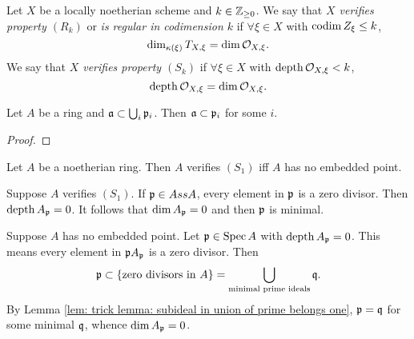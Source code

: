
    \begin{definition}\label{def: regular and Serre's conditions}
        Let $X$ be a locally noetherian scheme and $k \in {\mathbb{Z}}_{\geq 0}$.
        We say that \textit{$X$ verifies property $(R_k)$} or \textit{is regular in codimension $k$} if $\forall \xi \in X$ with $\operatorname{codim} Z_\xi \leq k$, 
        \[ \dim_{{\kappa}(\xi)} T_{X,\xi} = \dim {\mathcal{O}}_{X,\xi}. \]
        We say that \textit{$X$ verifies property $(S_k)$} if $\forall \xi \in X$ with $\operatorname{depth} {\mathcal{O}}_{X,\xi} < k$,
        \[ \operatorname{depth} {\mathcal{O}}_{X,\xi} = \dim {\mathcal{O}}_{X,\xi}. \]        
    \end{definition}

    \begin{lemma}\label{lem: trick lemma: subideal in union of prime belongs one}
        Let $A$ be a ring and ${\mathfrak{a}} \subset \bigcup_i {\mathfrak{p}}_i$.
        Then ${\mathfrak{a}} \subset {\mathfrak{p}}_i$ for some $i$.
    \end{lemma}
    \begin{proof}
    \end{proof}

    \begin{example}\label{eg: S_1 is equivalent to A has no embedded point}
        Let $A$ be a noetherian ring.
        Then $A$ verifies $(S_1)$ iff $A$ has no embedded point.
        
        Suppose $A$ verifies $(S_1)$.
        If ${\mathfrak{p}} \in Ass A$, every element in ${\mathfrak{p}}$ is a zero divisor.
        Then $\operatorname{depth} A_{{\mathfrak{p}}} = 0$.
        It follows that $\dim A_{\mathfrak{p}} = 0$ and then ${\mathfrak{p}}$ is minimal. 

        Suppose $A$ has no embedded point.
        Let ${\mathfrak{p}} \in \operatorname{Spec} A$ with $\operatorname{depth} A_{\mathfrak{p}} = 0$.
        This means every element in ${\mathfrak{p}} A_{\mathfrak{p}}$ is a zero divisor.
        Then 
        \[ {\mathfrak{p}} \subset \{\text{zero divisors in } A\} = \bigcup_{\text{minimal prime ideals}} {\mathfrak{q}}. \]
        By Lemma \ref{lem: trick lemma: subideal in union of prime belongs one}, ${\mathfrak{p}} = {\mathfrak{q}}$ for some minimal ${\mathfrak{q}}$, whence $\dim A_{\mathfrak{p}} = 0$. 
    \end{example}

